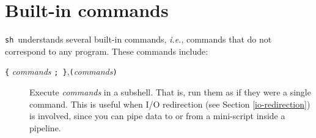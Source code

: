 \documentclass{article}
\newcommand{\code}[1]{\texttt{#1}}
\newcommand{\sh}{\code{sh}}
\begin{document}
\section{Built-in commands}

	\sh\ understands several built-in commands, \textit{i.e.},
commands that do not correspond to any program. These commands
include:

\begin{description}
\item[\code{\{} \textit{commands} \code{; \}},\code{(}\textit{commands}\code{)}]
	Execute \textit{commands} in a subshell. That is, run them as
	if they were a single command. This is useful when I/O
	redirection (see Section \ref{io-redirection}) is involved,
	since you can pipe data to or from a mini-script inside a
	pipeline.


\end{description}
\end{document}

